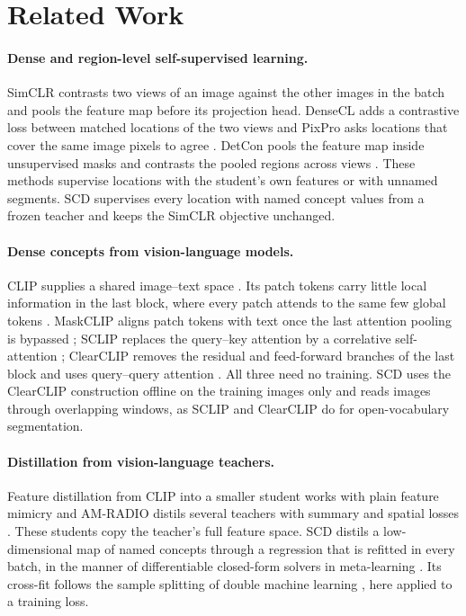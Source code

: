 \documentclass{article}
\begin{document}
\section{Related Work}
\paragraph{Dense and region-level self-supervised learning.}
SimCLR contrasts two views of an image against the other images in the batch \citep{chen2020simclr} and pools the feature map before its projection head. DenseCL adds a contrastive loss between matched locations of the two views \citep{wang2021densecl} and PixPro asks locations that cover the same image pixels to agree \citep{xie2021pixpro}. DetCon pools the feature map inside unsupervised masks and contrasts the pooled regions across views \citep{henaff2021detcon}. These methods supervise locations with the student's own features or with unnamed segments. SCD supervises every location with named concept values from a frozen teacher and keeps the SimCLR objective unchanged.

\paragraph{Dense concepts from vision-language models.}
CLIP supplies a shared image--text space \citep{radford2021clip}. Its patch tokens carry little local information in the last block, where every patch attends to the same few global tokens \citep{zhou2022maskclip,wang2024sclip,darcet2024registers}. MaskCLIP aligns patch tokens with text once the last attention pooling is bypassed \citep{zhou2022maskclip}; SCLIP replaces the query--key attention by a correlative self-attention \citep{wang2024sclip}; ClearCLIP removes the residual and feed-forward branches of the last block and uses query--query attention \citep{lan2024clearclip}. All three need no training. SCD uses the ClearCLIP construction offline on the training images only and reads images through overlapping windows, as SCLIP and ClearCLIP do for open-vocabulary segmentation.

\paragraph{Distillation from vision-language teachers.}
Feature distillation from CLIP into a smaller student works with plain feature mimicry \citep{yang2024clipkd} and AM-RADIO distils several teachers with summary and spatial losses \citep{ranzinger2024radio}. These students copy the teacher's full feature space. SCD distils a low-dimensional map of named concepts through a regression that is refitted in every batch, in the manner of differentiable closed-form solvers in meta-learning \citep{bertinetto2019r2d2,lee2019metaoptnet}. Its cross-fit follows the sample splitting of double machine learning \citep{chernozhukov2018dml}, here applied to a training loss.
\end{document}
